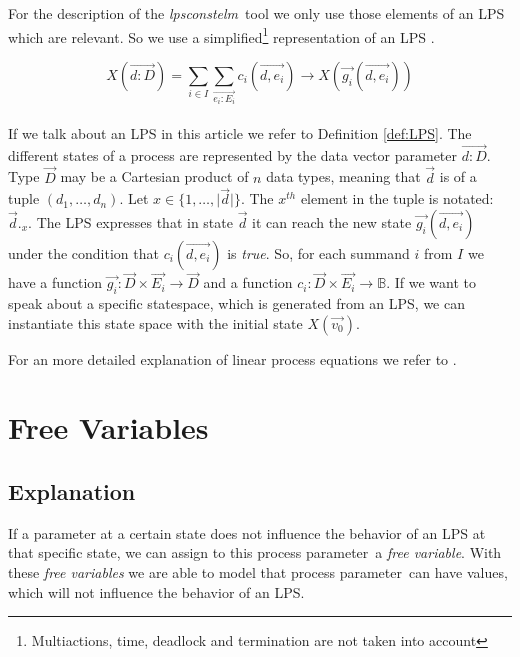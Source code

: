 \index{}\documentclass[a4paper,10pt]{article}
\theoremstyle{plain}
\theoremstyle{definition}
\newcommand{\lps}{linear process equation}
\newcommand{\tool}{\textit{lpsconstelm}}
\newcommand{\ovr}{\overrightarrow}
\newcommand{\pp}{process parameter}
\newcommand{\ti}{\textit}
\begin{document}
\noindent For the description of the \tool\ tool we only use those elements of an LPS which are relevant. So we use a simplified\footnote{Multiactions, time, deadlock and termination are not taken into account} representation of an LPS .
\begin{defn}\label{def:LPS}
\begin{displaymath}
X (\ovr{d:D}) = \sum_{i \in I} \sum_{\ovr{e_i:E_i}} c_i ( \ovr{d, e_i}) \rightarrow X(\ovr{g_i}(\ovr{d,e_i}))
\end{displaymath}\\
If we talk about an LPS in this article we refer to Definition \ref{def:LPS}.  The different states 
of a process are represented by the data vector parameter $\ovr{d: D}$. Type $\ovr{D}$ may be a Cartesian product of $n$ data types, meaning that $\ovr{d}$ is of a tuple $(d_1, \ldots, d_n)$. 
Let $x \in \lbrace 1, \ldots , \vert \ovr{d} \vert \rbrace$. The $x^{th}$ element in the tuple is notated: $\ovr{d}._x$.
The LPS expresses that in state $\ovr{d}$ %
it can reach the new state $\ovr{g_i}(\ovr{d,e_i})$ under the condition that $c_i(\ovr{d,e_i})$ is \ti{true}. So, for each summand $i$ from $I$ we have a function $\ovr{g_i}: \ovr{D} \times \ovr{E_i} \rightarrow \ovr{D}$ and a function $c_i: \ovr{D} \times \ovr{E_i} \rightarrow \mathbb{B}$.
If we want to speak about a specific statespace, which is generated from an LPS, we can instantiate this state space with the initial state $X(\ovr{v_0})$. 

\noindent For an more detailed explanation of \lps s  we refer to \cite{LPS_info}.
\end{defn}

\section{Free Variables}
\subsection{Explanation}

If a parameter at a certain state does not influence the behavior of an LPS at that specific state, we can assign to this \pp\ a \ti{free variable}. With these \ti{free variables} we are able to model that \pp\ can have values, which will not influence the behavior of an LPS.
\end{document}
